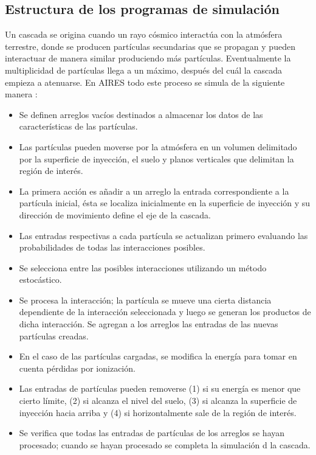 	\subsection{Estructura de los programas de simulación}
	Un cascada se origina cuando un rayo cósmico interactúa con la atmósfera terrestre, donde se producen partículas secundarias que se propagan y pueden interactuar de manera similar produciendo más partículas. Eventualmente la multiplicidad de partículas llega a un máximo, después del cuál  la cascada empieza a atenuarse. En AIRES todo este proceso se simula de la siguiente manera \cite{Sciutto2002}:
	\begin{itemize}
	\item Se definen arreglos vacíos destinados a almacenar los datos de las características de las partículas.
	\item Las partículas pueden moverse por la atmósfera en un volumen delimitado por la superficie de inyección, el suelo y planos verticales que delimitan la región de interés.
	\item La primera acción es añadir a un arreglo la entrada correspondiente a la partícula inicial, ésta se localiza inicialmente en la superficie de inyección y su dirección de movimiento define el eje de la cascada.
	\item Las entradas respectivas a cada partícula se actualizan primero evaluando las probabilidades de todas las interacciones posibles.
	\item Se selecciona entre las posibles interacciones utilizando un método estocástico.
	\item Se procesa la interacción; la partícula se mueve una cierta distancia dependiente de la interacción seleccionada y luego se generan los productos de dicha interacción. Se agregan a los arreglos las entradas de las nuevas partículas creadas.
	\item En el caso de las partículas cargadas, se modifica la energía para tomar en cuenta pérdidas por ionización.
	\item Las entradas de partículas pueden removerse (1) si su energía es menor que cierto límite, (2) si alcanza el nivel del suelo, (3) si alcanza la superficie de inyección hacia arriba y (4) si horizontalmente sale de la región de interés.
	\item Se verifica que todas las entradas de partículas de los arreglos se hayan procesado; cuando se hayan procesado se completa la simulación d la cascada.
	\end{itemize}	
	
